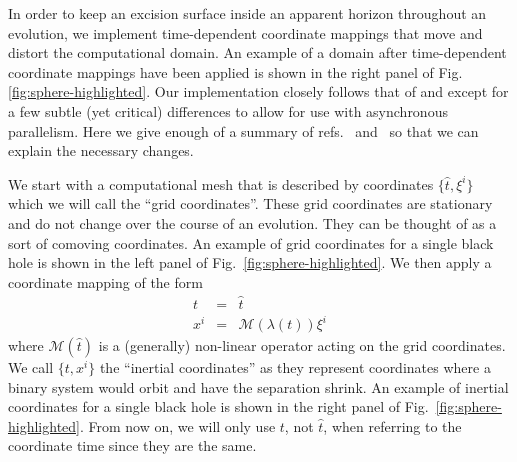 \begin{bibunit}[unsrtnat]
In order to keep an excision surface inside an apparent horizon throughout an
evolution, we implement time-dependent coordinate mappings that move and distort
the computational domain. An example of a domain after time-dependent coordinate
mappings have been applied is shown in the right panel of Fig.
\ref{fig:sphere-highlighted}. Our implementation closely follows that of
\cite{Scheel:2006gg} and \cite{Hemberger:2012jz} except for a few subtle (yet
critical) differences to allow for use with asynchronous parallelism. Here we
give enough of a summary of refs.~\cite{Scheel:2006gg}
and~\cite{Hemberger:2012jz} so that we can explain the necessary changes.

We start with a computational mesh that is described by coordinates $\{\hat{t},
\xi^{i}\}$ which we will call the ``grid coordinates''. These grid coordinates
are stationary and do not change over the course of an evolution. They can be
thought of as a sort of comoving coordinates. An example of grid coordinates for
a single black hole is shown in the left panel of
Fig.~\ref{fig:sphere-highlighted}. We then apply a coordinate mapping of the
form
\begin{eqnarray}
  t &=& \hat{t} \\
  x^{i} &=& \mathcal{M}(\lambda(t)) \xi^{i}
\end{eqnarray}
where $\mathcal{M}(\hat{t})$ is a (generally) non-linear operator acting on the
grid coordinates.
We call $\{t, x^{i}\}$ the ``inertial coordinates'' as they represent
coordinates where a binary system would orbit and have the separation shrink. An
example of inertial coordinates for a single black hole is shown in the right
panel of Fig.~\ref{fig:sphere-highlighted}. From now on, we will only use $t$,
not $\hat{t}$, when referring to the coordinate time since they are the same.


\end{bibunit}
